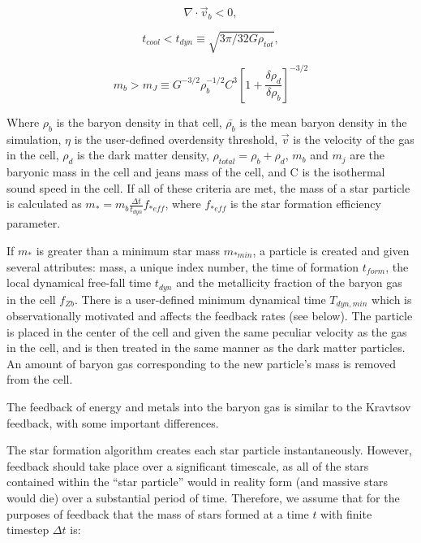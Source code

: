 \begin{equation}
\nabla \cdot \vec{v}_b < 0,
\label{cencont}
\end{equation}

\begin{equation}
t_{cool} < t_{dyn} \equiv \sqrt{3 \pi / 32G \rho_{tot}},
\end{equation}

\begin{equation}
m_{b} > m_{J} \equiv G^{-3/2} \rho_{b}^{-1/2}C^{3}
\left[ 1 + \frac{\delta\rho_{d}}{\delta\rho_{b}} \right]^{-3/2}
\end{equation}

Where $\rho_b$ is the baryon density in that cell, $\bar{\rho_b}$ is
the mean baryon density in the simulation, $\eta$ is the user-defined
overdensity threshold, $\vec{v}$ is the velocity of the gas in the
cell, $\rho_{d}$ is the dark matter density, $\rho_{total} = \rho_{b}
+ \rho_{d}$, $m_{b}$ and $m_{j}$ are the baryonic mass in the cell and
jeans mass of the cell, and C is the isothermal sound speed in the
cell.  If all of these criteria are met, the mass of a star particle
is calculated as \(m_{*} = m_{b} \frac{ \Delta t}{ t_{dyn} } f_{*eff}
\), where $f_{*eff}$ is the star formation efficiency parameter.

If $m_{*}$ is greater than a minimum star mass $m_{*min}$, a particle
is created and given several attributes: mass, a unique index number,
the time of formation $t_{form}$, the local dynamical free-fall time
$t_{dyn}$ and the metallicity fraction of the baryon gas in the cell
$f_{Zb}$.  There is a user-defined minimum dynamical time
$T_{dyn,min}$ which is observationally motivated and affects the
feedback rates (see below).  The particle is placed in the center of
the cell and given the same peculiar velocity as the gas in the cell,
and is then treated in the same manner as the dark matter particles.
An amount of baryon gas corresponding to the new particle's mass is
removed from the cell.


The feedback of energy and metals into the baryon gas is similar to
the Kravtsov feedback, with some important differences.  

The star formation algorithm creates each star particle
instantaneously.  However, feedback should take place over a
significant timescale, as all of the stars contained within the ``star
particle'' would in reality form (and massive stars would die) over a
substantial period of time.  Therefore, we assume that for the
purposes of feedback that the mass of stars formed at a time $t$ with
finite timestep $\Delta t$ is:

